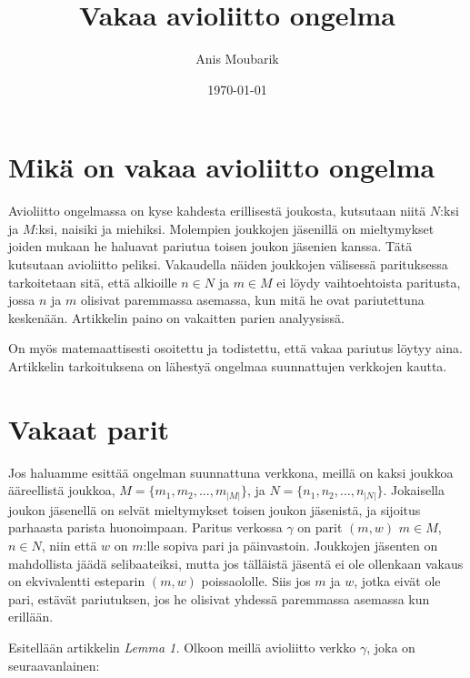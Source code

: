 \documentclass[finnish]{tktltiki2}
\title{Vakaa avioliitto ongelma}
\author{Anis Moubarik}
\date{\today}
\theoremstyle{definition}
\theoremstyle{remark}
\begin{document}

\maketitle        %
\makeabstract     %

\newpage          %



\section{Mikä on vakaa avioliitto ongelma}


Avioliitto ongelmassa on kyse kahdesta erillisestä joukosta, kutsutaan niitä $N$:ksi ja $M$:ksi, naisiki ja miehiksi. Molempien joukkojen jäsenillä on mieltymykset joiden mukaan he haluavat pariutua toisen joukon jäsenien kanssa. Tätä kutsutaan avioliitto peliksi.
Vakaudella näiden joukkojen välisessä parituksessa tarkoitetaan sitä, että alkioille $n \in N$ ja $m \in M$ ei löydy vaihtoehtoista paritusta, jossa $n$ ja $m$ olisivat paremmassa asemassa, kun mitä he ovat pariutettuna keskenään. Artikkelin paino on vakaitten parien analyysissä.

On myös matemaattisesti osoitettu ja todistettu, että vakaa pariutus löytyy aina. Artikkelin tarkoituksena on lähestyä ongelmaa suunnattujen verkkojen kautta.


\section{Vakaat parit}
Jos haluamme esittää ongelman suunnattuna verkkona, meillä on kaksi joukkoa ääreellistä joukkoa, 
$M = \{m_{1}, m_{2},..., m_{|M|}\}$, ja $N = \{n_{1}, n_{2},...,n_{|N|}\}$. Jokaisella joukon jäsenellä on selvät mieltymykset toisen joukon jäsenistä, ja sijoitus parhaasta parista huonoimpaan. Paritus verkossa $\gamma$ on parit $(m, w)$ $m \in M$, $n \in N$, niin että $w$ on $m$:lle sopiva pari ja päinvastoin. Joukkojen jäsenten on mahdollista jäädä selibaateiksi, mutta jos tälläistä jäsentä ei ole ollenkaan vakaus on ekvivalentti esteparin $(m, w)$ poissaololle.
Siis jos $m$ ja $w$, jotka eivät ole pari, estävät pariutuksen, jos he olisivat yhdessä paremmassa asemassa kun erillään.

Esitellään artikkelin \emph{Lemma 1.} Olkoon meillä avioliitto verkko $\gamma$, joka on seuraavanlainen:
\\
\end{document}
